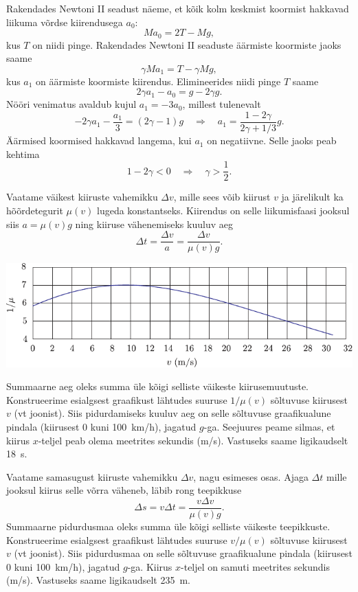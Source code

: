 \documentclass[10pt, twoside]{article}
\begin{document}
{%

\solu
Rakendades Newtoni II seadust näeme, et kõik kolm keskmist koormist hakkavad liikuma võrdse kiirendusega $a_0$: 
\[
M a_0 = 2T - Mg,
\]
kus $T$ on niidi pinge. Rakendades Newtoni II seaduste äärmiste koormiste jaoks saame
\[
\gamma M a_1 = T - \gamma Mg,
\]
kus $a_1$ on äärmiste koormiste kiirendus. Elimineerides niidi pinge $T$ saame
\[
2\gamma a_1 - a_0 = g - 2\gamma g.
\] 
Nööri venimatus avaldub kujul $a_1 = -3a_0$, millest tulenevalt 
\[
-2 \gamma a_{1}-\frac{a_{1}}{3}=(2 \gamma-1) g \quad \Rightarrow \quad a_{1}=\frac{1-2 \gamma}{2 \gamma+1 / 3} g.
\]
Äärmised koormised hakkavad langema, kui $a_1$ on negatiivne. Selle jaoks peab kehtima
\[
1-2 \gamma<0 \quad\Rightarrow\quad \gamma>\frac{1}{2}.
\]
\probend
\bigskip


\solu
\osa Vaatame väikest kiiruste vahemikku $\Delta v$, mille sees võib kiirust $v$ ja järelikult ka hõõrdetegurit $\mu (v)$ lugeda konstantseks. Kiirendus on selle liikumisfaasi jooksul siis $a = \mu (v)g$ ning kiiruse vähenemiseks kuuluv aeg
\[
\Delta t=\frac{\Delta v}{a}=\frac{\Delta v}{\mu(v) g}.
\]

\begin{center}
	\includegraphics[width=\linewidth]{2006-lahg-10-lah1}
\end{center}

Summaarne aeg oleks summa üle kõigi selliste väikeste kiirusemuutuste. Konstrueerime esialgsest graafikust lähtudes suuruse $1/\mu (v)$ sõltuvuse kiirusest $v$ (vt joonist). Siis pidurdamiseks kuuluv aeg on selle sõltuvuse graafikualune pindala (kiirusest \num{0} kuni \SI{100}{km/h}), jagatud $g$-ga. Seejuures peame silmas, et kiirus $x$-teljel peab olema meetrites sekundis (\si{m/s}). Vastuseks saame ligikaudselt \SI{18}{s}.

\osa Vaatame samasugust kiiruste vahemikku $\Delta v$, nagu esimeses osas. Ajaga $\Delta t$ mille jooksul kiirus selle võrra väheneb, läbib rong teepikkuse
\[
\Delta s = v\Delta t = \frac{v\Delta v}{\mu (v)g}.
\]
Summaarne pidurdusmaa oleks summa üle kõigi selliste väikeste teepikkuste. Konstrueerime esialgsest graafikust lähtudes suuruse $v/\mu (v)$ sõltuvuse kiirusest $v$ (vt joonist). Siis pidurdusmaa on selle sõltuvuse graafikualune pindala (kiirusest \num{0} kuni \SI{100}{km/h}), jagatud $g$-ga. Kiirus $x$-teljel on samuti meetrites sekundis (\si{m/s}). Vastuseks saame ligikaudselt \SI{235}{m}.

}
\end{document}
